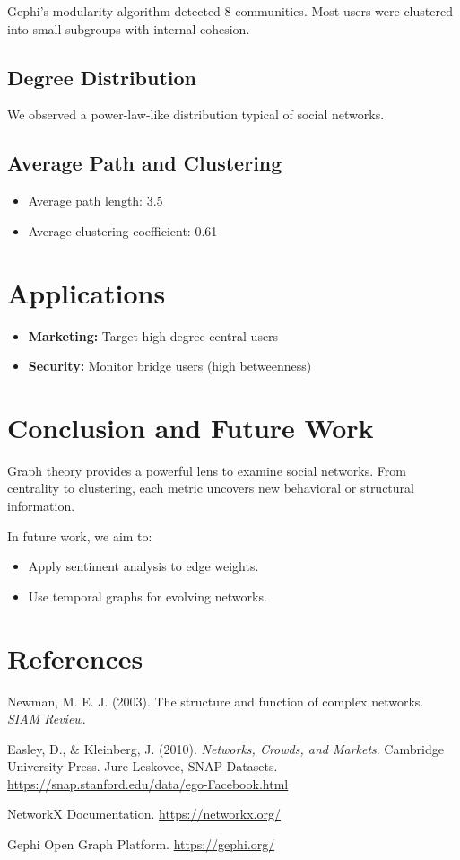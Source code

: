 \documentclass[conference]{IEEEtran}
\begin{document}
Gephi’s modularity algorithm detected 8 communities. Most users were clustered into small subgroups with internal cohesion.
\subsection{Degree Distribution}
We observed a power-law-like distribution typical of social networks.

\subsection{Average Path and Clustering}
\begin{itemize}
  \item Average path length: 3.5
  \item Average clustering coefficient: 0.61
\end{itemize}
\section{Applications}
\begin{itemize}
  \item \textbf{Marketing:} Target high-degree central users
  \item \textbf{Security:} Monitor bridge users (high betweenness)
\end{itemize}

\section{Conclusion and Future Work}
Graph theory provides a powerful lens to examine social networks. From centrality to clustering, each metric uncovers new behavioral or structural information.

In future work, we aim to:
\begin{itemize}
  \item Apply sentiment analysis to edge weights.
  \item Use temporal graphs for evolving networks.
\end{itemize}

\section*{References}
\begin{thebibliography}{00}
Newman, M. E. J. (2003). The structure and function of complex networks. \textit{SIAM Review}.

Easley, D., \& Kleinberg, J. (2010). \textit{Networks, Crowds, and Markets}. Cambridge University Press.
Jure Leskovec, SNAP Datasets. \url{https://snap.stanford.edu/data/ego-Facebook.html}

NetworkX Documentation. \url{https://networkx.org/}

Gephi Open Graph Platform. \url{https://gephi.org/}
\end{thebibliography}
\end{document}
